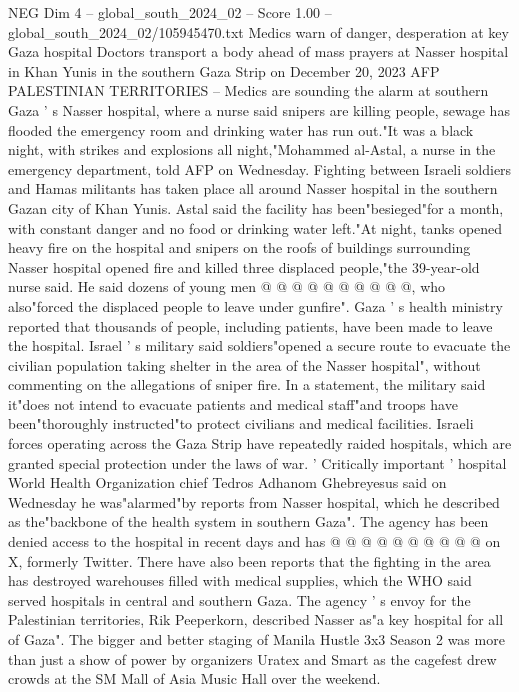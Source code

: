 \begin{textsample}{NEG Dim 4 – global\_south\_2024\_02 – Score 1.00 – global\_south\_2024\_02/105945470.txt}  \label{ex:f4_neg_388}
Medics warn of danger, desperation at key Gaza hospital Doctors transport a body ahead of mass prayers at Nasser hospital in Khan Yunis in the southern Gaza Strip on December 20, 2023 AFP PALESTINIAN TERRITORIES -- Medics are sounding the alarm at southern Gaza ' s Nasser hospital, where a nurse said snipers are killing people, sewage has flooded the emergency room and drinking water has run out."It was a black night, with strikes and explosions all night,"Mohammed al-Astal, a nurse in the emergency department, told AFP on Wednesday.
Fighting between Israeli soldiers and Hamas militants has taken place all around Nasser hospital in the southern Gazan city of Khan Yunis.
Astal said the facility has been"besieged"for a month, with constant danger and no food or drinking water left."At night, tanks opened heavy fire on the hospital and snipers on the roofs of buildings surrounding Nasser hospital opened fire and killed three displaced people,"the 39-year-old nurse said.
He said dozens of young men @ @ @ @ @ @ @ @ @ @, who also"forced the displaced people to leave under gunfire".
Gaza ' s health ministry reported that thousands of people, including patients, have been made to leave the hospital.
Israel ' s military said soldiers"opened a secure route to evacuate the civilian population taking shelter in the area of the Nasser hospital", without commenting on the allegations of sniper fire.
In a statement, the military said it"does not intend to evacuate patients and medical staff"and troops have been"thoroughly instructed"to protect civilians and medical facilities.
Israeli forces operating across the Gaza Strip have repeatedly raided hospitals, which are granted special protection under the laws of war. ' Critically important ' hospital World Health Organization chief Tedros Adhanom Ghebreyesus said on Wednesday he was"alarmed"by reports from Nasser hospital, which he described as the"backbone of the health system in southern Gaza".
The agency has been denied access to the hospital in recent days and has @ @ @ @ @ @ @ @ @ @ on X, formerly Twitter.
There have also been reports that the fighting in the area has destroyed warehouses filled with medical supplies, which the WHO said served hospitals in central and southern Gaza.
The agency ' s envoy for the Palestinian territories, Rik Peeperkorn, described Nasser as"a key hospital for all of Gaza".
The bigger and better staging of Manila Hustle 3x3 Season 2 was more than just a show of power by organizers Uratex and Smart as the cagefest drew crowds at the SM Mall of Asia Music Hall over the weekend.

\end{textsample}
